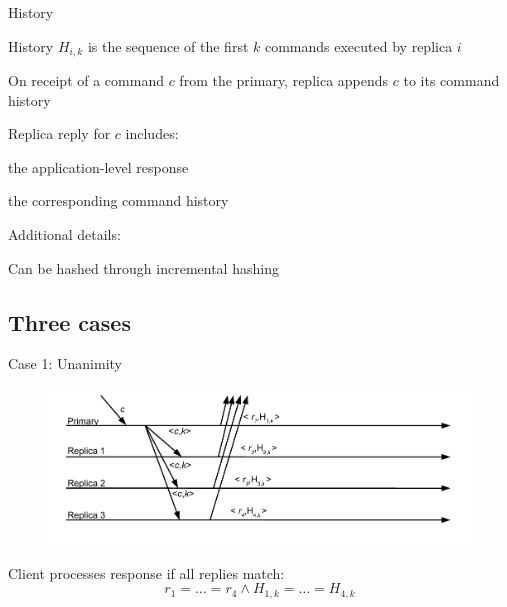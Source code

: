 \begin{frame}{History}

\BIL
\item \alert{History $H_{i,k}$} is the sequence of the first $k$ commands executed by
replica $i$

\item On receipt of a command $c$ from the primary, replica appends $c$ to its
command history 
\item Replica reply for $c$ includes: 
	\BI
	\item the application-level response
	\item the corresponding command history
	\EI
\item Additional details:
	\BI
	\item Can be hashed through \alert{incremental hashing}
	\EI

\EI

\end{frame}

\subsection{Three cases}

\begin{frame}{Case 1: Unanimity}
	
\begin{figure}
	\includegraphics[width=\textwidth]{figs/17/messages6}	
\end{figure}

\BIL
\item Client processes response if all replies match:
\[
  r_1 = \ldots =r_ 4 \wedge H_{1,k} = \ldots = H_{4,k}
\]
\EIL

\end{frame}

